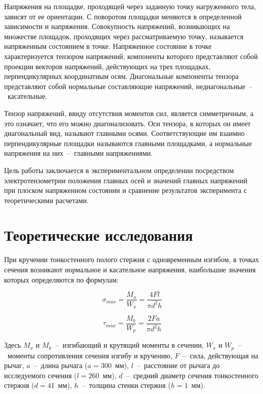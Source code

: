 \documentclass[12pt, a4paper]{article}
\begin{document}
    Напряжения на площадке, проходящей через заданную точку нагруженного тела, зависят от ее ориентации. С поворотом площадки меняются в определенной зависимости и напряжения. Совокупность напряжений, возникающих на множестве площадок, проходящих через рассматриваемую точку, называется напряженным состоянием в точке. Напряженное состояние в точке характеризуется тензором напряжений, компоненты которого представляют собой проекции векторов напряжений, действующих на трех площадках, перпендикулярных координатным осям. Диагональные компоненты тензора представляют собой нормальные составляющие напряжений, недиагональные~--~касательные.
    
    Тензор напряжений, ввиду отсутствия моментов сил, является симметричным, а это означает, что его можно диагонализовать. Оси тензора, в которых он имеет диагональный вид, называют главными осями. Соответствующие им взаимно перпендикулярные площадки называются главными площадками, а нормальные напряжения на них~--~главными напряжениями.
    
    Цель работы заключается в экспериментальном определении посредством электротензометрии положения главных осей и значений главных напряжений при плоском напряженном состоянии и сравнение результатов эксперимента с теоретическими расчетами.
    
    \newpage
    
    \section{Теоретические исследования}
    
    При кручении тонкостенного полого стержня с одновременным изгибом, в точках сечения возникают нормальное и касательное напряжения, наибольшие значения которых определяются по формулам:
    
    \begin{equation}
        \sigma_{max} = \frac{M_{x}}{W_{x}} = \frac{4Fl}{\pi d^{2} h}
        \label{eq1}
    \end{equation}
    
    \begin{equation}
        \tau_{max} = \frac{M_{k}}{W_{p}} = \frac{2Fa}{\pi d^{2} h}
        \label{eq2}
    \end{equation}
    
    Здесь $M_{x}$ и $M_{k}$~--~изгибающий и крутящий моменты в сечении, $W_{x}$ и $W_{p}$~--~моменты сопротивления сечения изгибу и кручению, $F$~--~сила, действующая на рычаг, $a$~--~длина рычага ($a = 300$~мм), $l$~--~расстояние от рычага до исследуемого сечения ($l = 260$~мм), $d$~--~средний диаметр сечения тонкостенного стержня ($d = 41$~мм), $h$~--~толщина стенки стержня ($h = 1$~мм).
    
\end{document}
